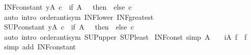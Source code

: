 \begin{isabellebody}
\endisatagproof
{\isafoldproof}%
%
\isadelimproof
\isanewline
%
\endisadelimproof
\isanewline
{}\isamarkupfalse%
\ INF{\isacharunderscore}{\kern0pt}constant{\isacharcolon}{\kern0pt}\ {\isachardoublequoteopen}{\isacharparenleft}{\kern0pt}{\isasymSqinter}y{\isasymin}A{\isachardot}{\kern0pt}\ c{\isacharparenright}{\kern0pt}\ {\isacharequal}{\kern0pt}\ {\isacharparenleft}{\kern0pt}if\ A\ {\isacharequal}{\kern0pt}\ {\isacharbraceleft}{\kern0pt}{\isacharbraceright}{\kern0pt}\ then\ {\isasymtop}\ else\ c{\isacharparenright}{\kern0pt}{\isachardoublequoteclose}\isanewline
%
\isadelimproof
\ \ %
\endisadelimproof
%
\isatagproof
{}\isamarkupfalse%
\ {\isacharparenleft}{\kern0pt}auto\ intro{\isacharcolon}{\kern0pt}\ order{\isachardot}{\kern0pt}antisym\ INF{\isacharunderscore}{\kern0pt}lower\ INF{\isacharunderscore}{\kern0pt}greatest{\isacharparenright}{\kern0pt}%
\endisatagproof
{\isafoldproof}%
%
\isadelimproof
\isanewline
%
\endisadelimproof
\isanewline
{}\isamarkupfalse%
\ SUP{\isacharunderscore}{\kern0pt}constant{\isacharcolon}{\kern0pt}\ {\isachardoublequoteopen}{\isacharparenleft}{\kern0pt}{\isasymSqunion}y{\isasymin}A{\isachardot}{\kern0pt}\ c{\isacharparenright}{\kern0pt}\ {\isacharequal}{\kern0pt}\ {\isacharparenleft}{\kern0pt}if\ A\ {\isacharequal}{\kern0pt}\ {\isacharbraceleft}{\kern0pt}{\isacharbraceright}{\kern0pt}\ then\ {\isasymbottom}\ else\ c{\isacharparenright}{\kern0pt}{\isachardoublequoteclose}\isanewline
%
\isadelimproof
\ \ %
\endisadelimproof
%
\isatagproof
{}\isamarkupfalse%
\ {\isacharparenleft}{\kern0pt}auto\ intro{\isacharcolon}{\kern0pt}\ order{\isachardot}{\kern0pt}antisym\ SUP{\isacharunderscore}{\kern0pt}upper\ SUP{\isacharunderscore}{\kern0pt}least{\isacharparenright}{\kern0pt}%
\endisatagproof
{\isafoldproof}%
%
\isadelimproof
\isanewline
%
\endisadelimproof
\isanewline
{}\isamarkupfalse%
\ INF{\isacharunderscore}{\kern0pt}const\ {\isacharbrackleft}{\kern0pt}simp{\isacharbrackright}{\kern0pt}{\isacharcolon}{\kern0pt}\ {\isachardoublequoteopen}A\ {\isasymnoteq}\ {\isacharbraceleft}{\kern0pt}{\isacharbraceright}{\kern0pt}\ {\isasymLongrightarrow}\ {\isacharparenleft}{\kern0pt}{\isasymSqinter}i{\isasymin}A{\isachardot}{\kern0pt}\ f{\isacharparenright}{\kern0pt}\ {\isacharequal}{\kern0pt}\ f{\isachardoublequoteclose}\isanewline
%
\isadelimproof
\ \ %
\endisadelimproof
%
\isatagproof
{}\isamarkupfalse%
\ {\isacharparenleft}{\kern0pt}simp\ add{\isacharcolon}{\kern0pt}\ INF{\isacharunderscore}{\kern0pt}constant{\isacharparenright}{\kern0pt}%
\endisatagproof

\end{isabellebody}
